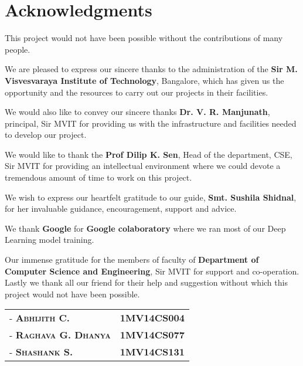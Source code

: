 \chapter*{Acknowledgments}
\noindent This project would not have been possible without the contributions of many people.\par\bigskip
We are pleased to express our sincere thanks to the administration of the \textbf{Sir M. Visvesvaraya Institute of Technology}, Bangalore, which has given us the opportunity and the resources to carry out our projects in their facilities.\par\bigskip
We would also like to convey our sincere thanks \textbf{Dr. V. R. Manjunath}, principal, Sir MVIT for providing us with the infrastructure and facilities needed to develop our project.\par\bigskip
We would like to thank the \textbf{Prof Dilip K. Sen}, Head of the department, CSE, Sir MVIT for providing an intellectual environment where we could devote a tremendous amount of time to work on this project.\par\bigskip
We wish to express our heartfelt gratitude to our guide, \textbf{Smt. Sushila Shidnal}, for her invaluable guidance, encouragement, support and advice.\par\bigskip
We thank \textbf{Google} for \textbf{Google colaboratory} where we ran most of our Deep Learning model training.\par\bigskip
Our immense gratitude for the members of faculty of \textbf{Department of Computer Science and Engineering}, Sir MVIT for support and co-operation. Lastly we thank all our friend for their help and suggestion without which this project would not have been possible.\par\bigskip
\vspace{50px}
\noindent\hfill\begin{tabular}{ l r }
        \textsc{-  \textbf{Abhijith C.}}       &  \textbf{1MV14CS004} \\
        \textsc{-  \textbf{Raghava G. Dhanya}} &  \textbf{1MV14CS077} \\
        \textsc{-  \textbf{Shashank S.}}       &  \textbf{1MV14CS131}
\end{tabular}